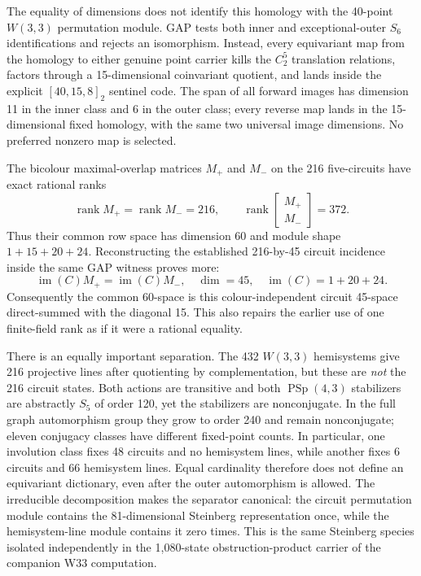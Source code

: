 \documentclass[11pt,letterpaper]{article}
\newcommand{\tagbox}[3]{\tikz[baseline=(X.base)]{\node[inner xsep=3.5pt,inner ysep=1.4pt,rounded corners=1.6pt,fill=#1,text=#2,font=\bfseries\sffamily\tiny] (X) {#3};}}
\newcommand{\PROVED}{\tagbox{greenlite}{green!45!black}{PROVED}}
\newcommand{\W}{\ensuremath{W(3,3)}}
\begin{document}
The equality of dimensions does not identify this homology with the 40-point
\W{} permutation module. GAP tests both inner and exceptional-outer $S_6$
identifications and rejects an isomorphism. Instead, every equivariant map
from the homology to either genuine point carrier kills the $C_2^5$
translation relations, factors through a 15-dimensional coinvariant quotient,
and lands inside the explicit $[40,15,8]_2$ sentinel code. The span of all
forward images has dimension 11 in the inner class and 6 in the outer class;
every reverse map lands in the 15-dimensional fixed homology, with the same
two universal image dimensions. No preferred nonzero map is selected.
\PROVED

The bicolour maximal-overlap matrices $M_+$ and $M_-$ on the 216 five-circuits
have exact rational ranks
\[
 \operatorname{rank}M_+=\operatorname{rank}M_-=216,\qquad
 \operatorname{rank}\!\begin{bmatrix}M_+\\M_-\end{bmatrix}=372.
\]
Thus their common row space has dimension 60 and module shape
$1+15+20+24$. Reconstructing the established 216-by-45 circuit incidence
inside the same GAP witness proves more:
\[
 \operatorname{im}(C)M_+=\operatorname{im}(C)M_-,
 \quad \dim=45,\quad
 \operatorname{im}(C)=1+20+24.
\]
Consequently the common 60-space is this colour-independent circuit
45-space direct-summed with the diagonal 15. This also repairs the earlier
use of one finite-field rank as if it were a rational equality. \PROVED

There is an equally important separation. The 432 \W{} hemisystems give 216
projective lines after quotienting by complementation, but these are
\emph{not} the 216 circuit states. Both actions are transitive and both
$\operatorname{PSp}(4,3)$ stabilizers are abstractly $S_5$ of order 120, yet
the stabilizers are nonconjugate. In the full graph automorphism group they
grow to order 240 and remain nonconjugate; eleven conjugacy classes have
different fixed-point counts. In particular, one involution class fixes 48
circuits and no hemisystem lines, while another fixes 6 circuits and 66
hemisystem lines. Equal cardinality therefore does not define an equivariant
dictionary, even after the outer automorphism is allowed. The irreducible
decomposition makes the separator canonical: the circuit permutation module
contains the 81-dimensional Steinberg representation once, while the
hemisystem-line module contains it zero times. This is the same Steinberg
species isolated independently in the 1,080-state obstruction-product carrier
of the companion W33 computation. \PROVED
\end{document}
